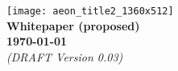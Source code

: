 
\newcommand{\titlesize}{\fontsize{32pt}{20pt}\selectfont}

\begin{titlepage}
	\vspace*{48pt}
	\centering
	\texttt{[image: aeon\_title2\_1360x512]}
	\\
	\vspace{80pt}
	{\titlesize \textbf{Whitepaper (proposed)}}
	\\
	\vspace{36pt}
	\textbf{\today}
	\\
	\vspace{18pt}
	{\small\em (DRAFT Version 0.03)}

\end{titlepage}